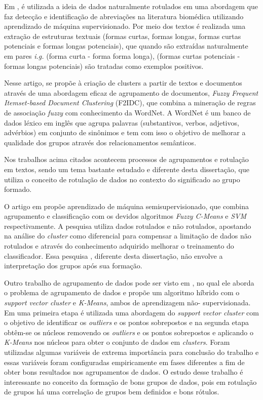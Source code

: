 Em \cite{Yeganova2010}, é utilizada a ideia de dados naturalmente rotulados em uma abordagem que faz detecção e identificação de abreviações na literatura biomédica utilizando aprendizado de máquina supervisionado. Por meio dos textos é realizada uma extração de estruturas textuais (formas curtas, formas longas, formas curtas potenciais e formas longas potenciais), que quando são extraídas naturalmente em pares \textit{i.g.} (forma curta - forma forma longa), (formas curtas potenciais - formas longas potenciais) são tratadas como exemplos positivos. 

Nesse artigo, \cite{Chen2011} se propõe à criação de clusters a partir de textos e documentos através de uma abordagem eficaz de agrupamento de documentos, \textit{Fuzzy Frequent Itemset-based Document Clustering} (F2IDC), que combina a mineração de regras de associação \textit{fuzzy} com conhecimento da WordNet. A WordNet é um banco de dados léxico em inglês que agrupa palavras (substantivos, verbos, adjetivos, advérbios) em conjunto de sinônimos e tem com isso o objetivo de melhorar a qualidade dos grupos através dos relacionamentos semânticos. 
 
Nos trabalhos acima citados \cite{Jirasirilerd2018,Yeganova2010,Chen2011} acontecem processos de agrupamentos e rotulação em textos, sendo um tema bastante estudado e diferente desta dissertação, que utiliza o conceito de rotulação de dados no contexto do significado ao grupo formado. 



O artigo em \cite{Gan2013}  propõe aprendizado de máquina semisupervisionado, que combina agrupamento e classificação com os devidos algoritmos \textit{Fuzzy C-Means} e \textit{SVM} respectivamente. A pesquisa utiliza dados rotulados e não rotulados, apostando na análise do \textit{cluster} como diferencial para compensar a limitação de dados não rotulados e através do conhecimento adquirido melhorar o treinamento do classificador. Essa pesquisa \cite{Gan2013}, diferente desta dissertação, não envolve a interpretação dos grupos após sua formação.

Outro trabalho de agrupamento de dados pode ser visto em \cite{Sun2011}, no qual ele aborda o problema de agrupamento de dados e propõe um algoritmo híbrido com o \textit{support vector cluster} e \textit{K-Means}, ambos de aprendizagem não- supervisionada. Em uma primeira etapa é utilizada uma abordagem do \textit{support vector cluster} com o objetivo de identificar os \textit{outliers} e os pontos sobrepostos e na segunda etapa obtêm-se os núcleos removendo os \textit{outliers} e os pontos sobrepostos e aplicando o \textit{K-Means} nos núcleos para obter o conjunto de dados em \textit{clusters}. Foram utilizadas algumas variáveis de extrema importância para conclusão do trabalho e essas variáveis foram configuradas empiricamente em fases diferentes a fim de obter bons resultados nos agrupamentos de dados. O estudo desse trabalho é interessante no conceito da formação de bons grupos de dados, pois em rotulação de grupos há uma correlação de grupos bem definidos e bons rótulos.

